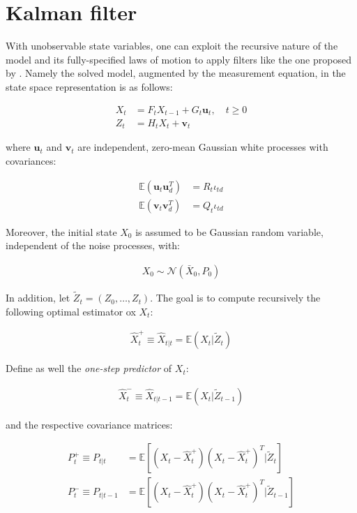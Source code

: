 \documentclass{pracamgr}
\numberwithin{equation}{section}
\begin{document}
\section{Kalman filter}

With unobservable state variables, one can exploit the recursive nature of the model and its fully-specified laws of motion to apply filters like the one proposed by \citet{kalman1960new}. Namely the solved model, augmented by the measurement equation, in the state space representation is as follows:

\begin{align}
X_{t} &= F_{t} X_{t-1} + G_{t} \mathbf{u}_{t}, \quad t \geqslant 0 \\
Z_{t} &= H_{t} X_{t} + \mathbf{v}_{t}
\end{align}

where $\mathbf{u}_{t}$ and $\mathbf{v}_{t}$ are independent, zero-mean Gaussian white processes with covariances:

\begin{align}
\mathbb{E} \left(\mathbf{u}_{t} \mathbf{u}_{d}^{T} \right) &= R_{t} \iota _{td} \\
\mathbb{E} \left(\mathbf{v}_{t} \mathbf{v}_{d}^{T} \right) &= Q_{t} \iota _{td}
\end{align}


Moreover, the initial state $X_{0}$ is assumed to be Gaussian random variable, independent of the noise processes, with:

\begin{align}
X_{0} \sim \mathcal{N} \left(\bar{X}_{0}, P_{0} \right)
\end{align}

In addition, let $\tilde{Z}_{t} = (Z_{0}, \ldots, Z_{t})$. The goal is to compute recursively the following optimal estimator ox $X_{t}$:

\begin{align}
\hat{X}_{t}^{+} \equiv \hat{X}_{t | t} = \mathbb{E} (X_{t} | \tilde{Z}_{t})
\end{align}

Define as well the \textit{one-step predictor} of $X_{t}$:

\begin{align}
\hat{X}_{t}^{-} \equiv \hat{X}_{t | t-1} = \mathbb{E} (X_{t} | \tilde{Z}_{t-1})
\end{align}

and the respective covariance matrices:

\begin{align}
P_{t}^{+} \equiv P_{t | t} &= \mathbb{E} \left[ \left(X_{t} -\hat{X}_{t}^{+} \right) \left(X_{t} - \hat{X}_{t}^{+} \right)^{T} |  \tilde{Z}_{t}\right] \\
P_{t}^{-} \equiv P_{t | t-1} &= \mathbb{E} \left[ \left(X_{t} -\hat{X}_{t}^{+} \right) \left(X_{t} - \hat{X}_{t}^{+} \right)^{T} |  \tilde{Z}_{t-1} \right]
\end{align}
\end{document}

